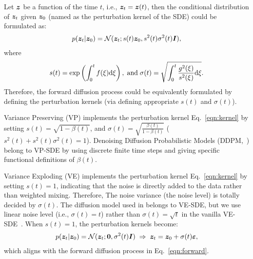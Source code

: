 Let ${\bm{z}}$ be a function of the time $t$, i.e., ${\bm{z}}_t = {\bm{z}}(t)$, then the conditional distribution of ${\bm{z}}_t$ given ${\bm{z}}_0$ (named as the perturbation kernel of the SDE) could be formulated as:
\begin{equation}\label{eqn:kernel}
    p({\bm{z}}_t | {\bm{z}}_0) = {\mathcal{N}}({\bm{z}}_t; s(t){\bm{z}}_0, s^2(t) \sigma^2(t) {\bm{I}}),
\end{equation}
where
\begin{equation}
    s(t) = \exp \left(\int_0^t f(\xi){\rm d}\xi \right), \; \mbox{and} \; \sigma(t) = \sqrt{\int_0^t \frac{g^2(\xi)}{s^2(\xi)} {\rm d} \xi}.
\end{equation}
Therefore, the forward diffusion process could be equivalently formulated by defining the perturbation kernels (via defining appropriate $s(t)$ and $\sigma(t)$).

Variance Preserving (VP) implements the perturbation kernel Eq.~\ref{eqn:kernel} by setting $s(t) = \sqrt{1-\beta(t)}$, and  $\sigma(t) = \sqrt{\frac{\beta(t)}{1-\beta(t)}}$ ($s^2(t) + s^2(t)\sigma^2(t) = 1$). Denoising Diffusion Probabilistic Models (DDPM,~\citet{ddpm}) belong to VP-SDE by using discrete finite time steps and giving specific functional definitions of $\beta(t)$.

Variance Exploding (VE) implements the perturbation kernel  Eq.~\ref{eqn:kernel} by setting $s(t) = 1$, indicating that the noise is directly added to the data rather than weighted mixing. Therefore, The noise variance (the noise level) is totally decided by $\sigma(t)$. The diffusion model used in \modelname belongs to VE-SDE, but we use linear noise level (i.e., $\sigma(t) = t$) rather than $\sigma(t) = \sqrt{t}$ in the vanilla VE-SDE~\citep{vp}. When $s(t) = 1$, the perturbation kernels become:
\begin{equation}
    p({\bm{z}}_t|{\bm{z}}_0) = {\mathcal{N}}({\bm{z}}_t; \bm{0}, \sigma^2(t){\bm{I}}) \; \Rightarrow  \; {\bm{z}}_t = {\bm{z}}_0 + \sigma(t)\bm{\varepsilon},
\end{equation}
which aligns with the forward diffusion process in Eq.~\ref{eqn:forward}.

